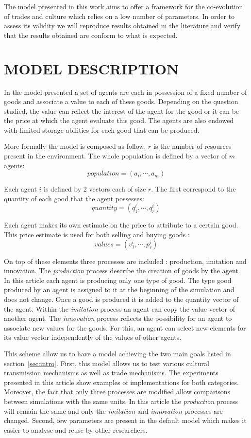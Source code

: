 \documentclass{wscpaperproc}
\begin{document}
The model presented in this work aims to offer a framework for the co-evolution of trades and culture which relies on a low number of parameters. In order to assess its validity we will reproduce results obtained in the literature and verify that the results obtained are conform to what is expected.



\section{MODEL DESCRIPTION}

In the model presented a set of agents are each in possession of a fixed number of goods and associate a value to each of these goods. Depending on the question studied, the value can reflect the interest of the agent for the good or it can be the price at which the agent evaluate this good. The agents are also endowed with limited storage abilities for each good that can be produced. 


More formally the model is composed as follow. $r$ is the number of resources present in the environment. The whole population is defined by a vector of $m$ agents: 
$$ population = (a_i, \cdots ,a_m) $$
		
Each agent $i$ is defined by 2 vectors each of size $r$. The first correspond to the quantity of each good that the agent possesses: $$ quantity = (q^i_1,\cdots,q^i_r) $$

Each agent makes its own estimate on the price to attribute to a certain good. This price estimate is used for both selling and buying goods :
$$ values = (v^i_1,\cdots,p^i_r) $$

On top of these elements three processes are included : production, imitation and innovation. The \textit{production} process describe the creation of goods by the agent. In this article each agent is producing only one type of good. The type good produced by an agent is assigned to it at the beginning of the simulation and does not change. Once a good is produced it is added to the quantity vector of the agent. Within the \textit{imitation} process an agent can copy the value vector of another agent. The \textit{innovation} process reflects the possibility for an agent to associate new values for the goods. For this, an agent can select new elements for its value vector independently of the values of other agents. 

This scheme allow us to have a model achieving the two main goals listed in section~\ref{sec:intro}. First, this model allows us to test various cultural transmission mechanisms as well as trade mechanisms. The experiments presented in this article show examples of implementations for both categories. Moreover, the fact that only three processes are modified allow comparisons between simulations with the same units. In this article the \textit{production} process will remain the same and only the \textit{imitation} and \textit{innovation} processes are changed. Second, few parameters are present in the default model which makes it easier to analyse and reuse by other researchers.
\end{document}
